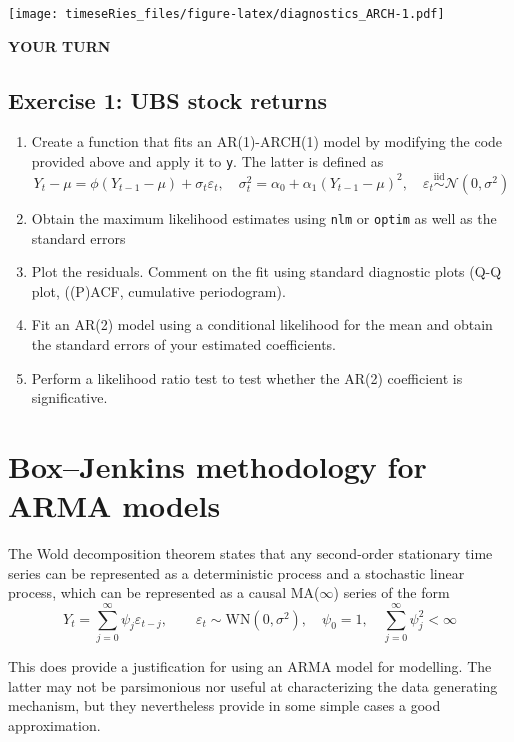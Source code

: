 \documentclass[]{book}
\providecommand{\tightlist}{%
  \setlength{\itemsep}{0pt}\setlength{\parskip}{0pt}}
\begin{document}
\texttt{[image: timeseRies\_files/figure-latex/diagnostics\_ARCH-1.pdf]}

\textbf{YOUR TURN}

\subsection{Exercise 1: UBS stock
returns}\label{exercise-1-ubs-stock-returns}

\begin{enumerate}
\def\labelenumi{\arabic{enumi}.}
\tightlist
\item
  Create a function that fits an AR(1)-ARCH(1) model by modifying the
  code provided above and apply it to \texttt{y}. The latter is defined
  as
  \[Y_t-\mu = \phi(Y_{t-1}-\mu)+\sigma_t\varepsilon_t, \quad \sigma^2_t = \alpha_0+\alpha_1(Y_{t-1}-\mu)^2, \quad \varepsilon_t \stackrel{\mathrm{iid}}{\sim} \mathcal{N}(0,\sigma^2)\]
\item
  Obtain the maximum likelihood estimates using \texttt{nlm} or
  \texttt{optim} as well as the standard errors
\item
  Plot the residuals. Comment on the fit using standard diagnostic plots
  (Q-Q plot, ((P)ACF, cumulative periodogram).
\item
  Fit an AR(2) model using a conditional likelihood for the mean and
  obtain the standard errors of your estimated coefficients.
\item
  Perform a likelihood ratio test to test whether the AR(2) coefficient
  is significative.
\end{enumerate}

\section{Box--Jenkins methodology for ARMA
models}\label{boxjenkins-methodology-for-arma-models}

The Wold decomposition theorem states that any second-order stationary
time series can be represented as a deterministic process and a
stochastic linear process, which can be represented as a causal
MA(\(\infty\)) series of the form
\[Y_t = \sum_{j = 0}^\infty \psi_j\varepsilon_{t-j}, \qquad \varepsilon_t \sim \mathrm{WN}(0, \sigma^2),\quad \psi_0 = 1, \quad\sum_{j = 0}^\infty \psi_j^2 < \infty\]

This does provide a justification for using an ARMA model for modelling.
The latter may not be parsimonious nor useful at characterizing the data
generating mechanism, but they nevertheless provide in some simple cases
a good approximation.
\end{document}
